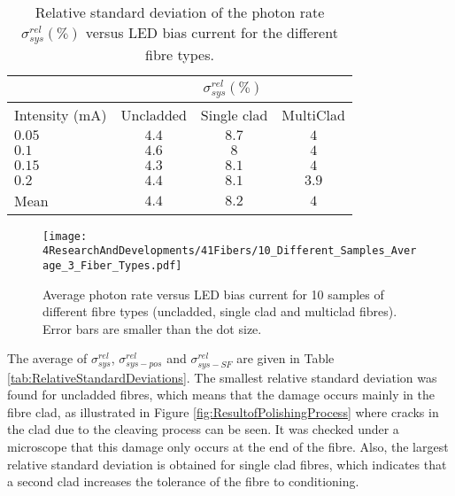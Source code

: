\begin{table}[h]
\centering{}%
\begin{tabular}{lccc}
\toprule 
 & \multicolumn{3}{c}{$\sigma^{rel}_{sys}(\%)$} \tabularnewline
\midrule
Intensity (mA) & Uncladded & Single clad & MultiClad \tabularnewline
\midrule
\midrule
$0.05$ & $4.4$ & $8.7$ & $4$ \tabularnewline
$0.1$ & $4.6$ & $8$ & $4$ \tabularnewline
$0.15$ & $4.3$ & $8.1$ & $4$ \tabularnewline
$0.2$ & $4.4$ & $8.1$ & $3.9$ \tabularnewline
\midrule 
Mean & $4.4$ & $8.2$ & $4$ \tabularnewline
\bottomrule
\end{tabular}
\caption{Relative standard deviation of the photon rate $\sigma^{rel}_{sys}(\%)$ versus LED bias current for the different fibre types.}
\label{tab:RelativeStandardDeviation3FiberTypes}
\end{table}

\begin{figure}[h]
\centering
\texttt{[image: 4ResearchAndDevelopments/41Fibers/10\_Different\_Samples\_Average\_3\_Fiber\_Types.pdf]}
\caption{Average photon rate versus LED bias current for 10 samples of different fibre types (uncladded, single clad and multiclad fibres). Error bars are smaller than the dot size.\label{fig:AveregeThreeFiberTypes}}
\end{figure}



The average of $\sigma^{rel}_{sys}$, $\sigma^{rel}_{sys-pos}$ and $\sigma^{rel}_{sys-SF}$ are given in Table \ref{tab:RelativeStandardDeviations}. The smallest relative standard deviation was found for uncladded fibres, which means that the damage occurs mainly in the fibre clad, as illustrated in Figure \ref{fig:ResultofPolishingProcess} where cracks in the clad due to the cleaving process can be seen. It was checked under a microscope that this damage only occurs at the end of the fibre. Also, the largest relative standard deviation is obtained for single clad fibres, which indicates that a second clad increases the tolerance of the fibre to conditioning.


